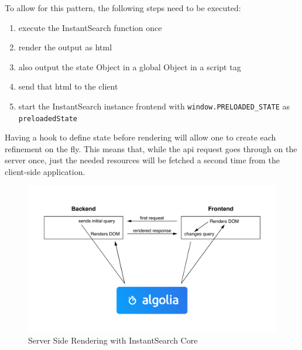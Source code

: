 To allow for this pattern, the following steps need to be executed:

\begin{enumerate}
  \item execute the InstantSearch function once
  \item render the output as html
  \item also output the state Object in a global Object in a script tag
  \item send that html to the client
  \item start the InstantSearch instance frontend with {\tt window.PRELOADED\_STATE} as {\tt preloadedState}
\end{enumerate}

Having a hook to define state before rendering will allow one to create each refinement on the fly. This means that, while the \acrshort{api} request goes through on the server once, just the needed resources will be fetched a second time from the client-side application. 

\begin{figure}[H]
  \centering
  \includegraphics[height=0.4\textheight]{../assets/is-core-ssr.pdf}
  \caption{Server Side Rendering with InstantSearch Core}
  \label{figure:is-core-ssr}
\end{figure} %

